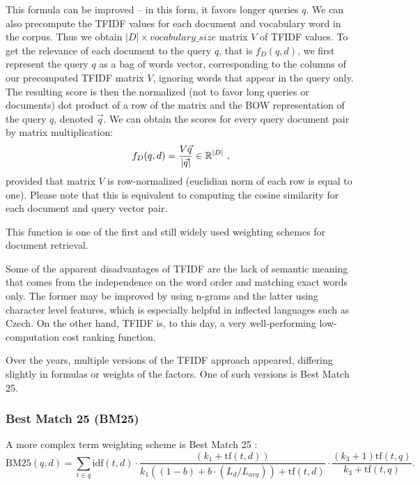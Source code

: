 This formula can be improved -- in this form, it favors longer queries $q$.
We can also precompute the TFIDF values for each document and vocabulary word in the corpus.
Thus we obtain $|D|\times {vocabulary\_size}$ matrix $V$ of TFIDF values.
To get the relevance of each document to the query $q$, that is $f_D(q, d)$, we first represent the query $q$ as a bag of words vector, corresponding to the columns of our precomputed TFIDF matrix $V$, ignoring words that appear in the query only. %
The resulting score is then the normalized (not to favor long queries or documents) dot product of a row of the matrix and the BOW representation of the query $q$, denoted $\vec{q}$.
We can obtain the scores for every query document pair by matrix multiplication:
$$
f_D(q, d) = \frac{V\vec{q}}{|\vec{q}|} \in \mathbb{R}^{|D|}\ ,
$$
provided that matrix $V$ is row-normalized (euclidian norm of each row is equal to one).
Please note that this is equivalent to computing the cosine similarity for each document and query vector pair.

This function is one of the first and still widely used \citep{Beel2016} weighting schemes for document retrieval. 

Some of the apparent disadvantages of TFIDF are the lack of semantic meaning that comes from the independence on the word order and matching exact words only. %
The former may be improved by using n-grams and the latter using character level features, which is especially helpful in inflected languages such as Czech.
On the other hand, TFIDF is, to this day, a very well-performing low-computation cost ranking function.

Over the years, multiple versions of the TFIDF approach appeared, differing slightly in formulas or weights of the factors. One of such versions is Best Match 25. %

\subsubsection{Best Match 25 (BM25)}

A more complex term weighting scheme is Best Match 25 \citep{bm25}:
$$
\text{BM25}(q, d) = 
        \sum_{t\in q}
        \text{idf}(t, d)
        \cdot \frac{(k_1 + \text{tf}(t, d))}{k_1((1-b) + b \cdot (L_d / L_{avg})) + \text{tf}(t, d)} 
        \cdot \frac{(k_3 + 1)\text{tf}(t, q)}{k_3 + \text{tf}(t, q)}.
$$

